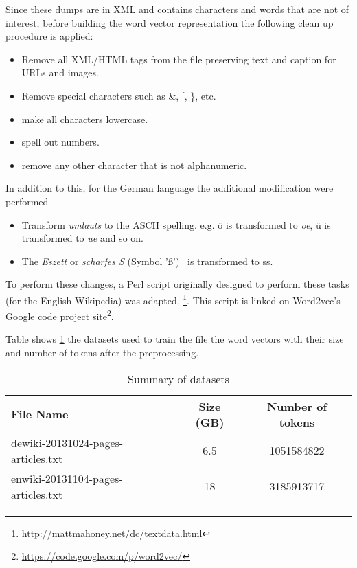 Since these dumps are in XML and contains characters and words that are not of
interest, before building the word vector representation the following clean up
procedure is applied:

\begin{itemize}
\item Remove all XML/HTML tags from the file preserving text and caption for
 URLs and images.
\item Remove special characters such as \&,  [, \}, etc.
\item make all characters lowercase.
\item spell out numbers.
\item remove any other character that is not alphanumeric.
\end{itemize}

In addition to this, for the German language the additional modification were
performed
\begin{itemize}
\item Transform \textit{umlauts} to the ASCII spelling.  e.g. \"{o} is
  transformed to \textit{oe},  \"{u} is transformed to \textit{ue}  and so
  on. 
\item The \textit{Eszett} or \textit{scharfes S} (Symbol '\ss') \  is transformed to ss.
\end{itemize}


To perform these changes, a Perl script originally
designed to perform these tasks (for the English Wikipedia) was adapted.
\footnote{\url{http://mattmahoney.net/dc/textdata.html}}. This script is
linked on Word2vec's Google code project site\footnote{\url{https://code.google.com/p/word2vec/}}.

Table shows \ref{tab:summ_dataset_germanword2vec} the datasets used
to train the file the word vectors with their size and number of tokens after
the preprocessing. 
  

 \begin{table}[h]

   \centering
   
   \caption{Summary of datasets} 
   \label{tab:summ_dataset_germanword2vec}
   \small
   \begin{tabular}{ |l|c|c| }
   \hline           
    File Name &  Size (GB) & Number of tokens  \\  \hline           
    dewiki-20131024-pages-articles.txt & 6.5 &   1051584822 \\ 
    enwiki-20131104-pages-articles.txt & 18 &  3185913717  \\
    \hline

\end{tabular}
\end{table}

